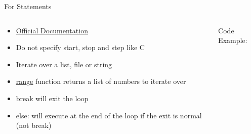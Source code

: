 % 
% 
% 
\begin{Slide}{For Statements}
  \begin{columns}
    \begin{column}{.48\textwidth}
      
      \begin{itemize}
      \item \underline{\href{https://docs.python.org/3/tutorial/controlflow.html\#for-statements}{Official Documentation}}
      \item Do not specify start, stop and step like C
      \item Iterate over a list, file or string
      \item \underline{\href{https://docs.python.org/3/library/stdtypes.html\#range}{range}} function returns a list of numbers to iterate over
      \item break will exit the loop 
      \item else: will execute at the end of the loop if the exit is normal (not break)
      \end{itemize}
      
      
    \end{column}

    \hfill

    \begin{column}{.48\textwidth}
      Code Example:
      
    \inputminted[firstline=3,
      lastline=20,
      breaklines,
      fontsize=\tiny,
      bgcolor=Background,
      linenos]{python}{../src/forexample.py}
      
      
    \end{column}
  \end{columns}
\end{Slide}

